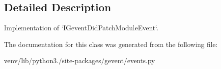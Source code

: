 \subsection{Detailed Description}
\begin{DoxyVerb}Implementation of `IGeventDidPatchModuleEvent`.
\end{DoxyVerb}
 

The documentation for this class was generated from the following file\+:\begin{DoxyCompactItemize}
\item 
venv/lib/python3./site-\/packages/gevent/events.\+py\end{DoxyCompactItemize}
